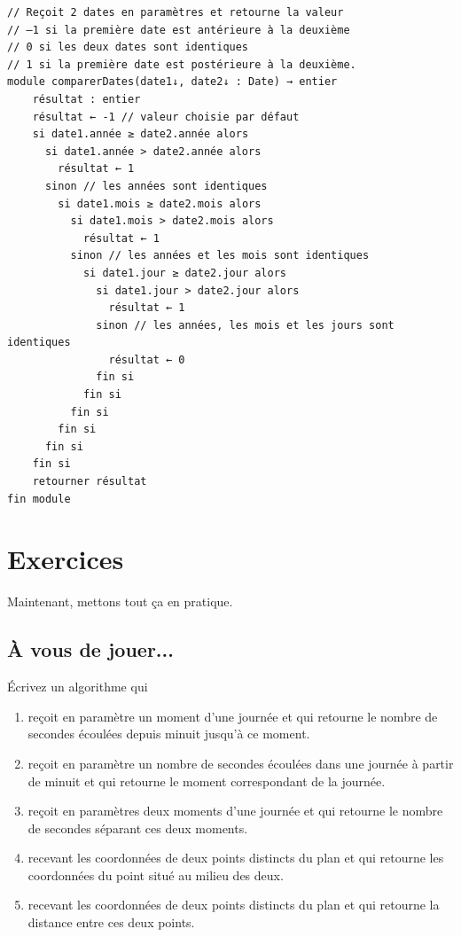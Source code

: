 \documentclass[11pt,a4paper]{article}
\begin{document}
            \par
        \begin{verbatim}
// Reçoit 2 dates en paramètres et retourne la valeur
// –1 si la première date est antérieure à la deuxième
// 0 si les deux dates sont identiques
// 1 si la première date est postérieure à la deuxième.
module comparerDates(date1↓, date2↓ : Date) → entier
    résultat : entier
    résultat ← -1 // valeur choisie par défaut
    si date1.année ≥ date2.année alors
      si date1.année > date2.année alors
        résultat ← 1
      sinon // les années sont identiques
        si date1.mois ≥ date2.mois alors
          si date1.mois > date2.mois alors
            résultat ← 1
          sinon // les années et les mois sont identiques
            si date1.jour ≥ date2.jour alors
              si date1.jour > date2.jour alors
                résultat ← 1
              sinon // les années, les mois et les jours sont identiques
                résultat ← 0
              fin si
            fin si
          fin si
        fin si
      fin si
    fin si
    retourner résultat
fin module
      \end{verbatim}\section{Exercices}
				Maintenant, mettons tout \c ca en pratique.
      
            \par
        \subsection{\`A vous de jouer...}
        \'Ecrivez un algorithme qui 
          
					\begin{enumerate}
				
			\item re\c coit en param\`etre un moment d'une journ\'ee et qui retourne le nombre de secondes \'ecoul\'ees depuis minuit jusqu'\`a ce moment.
			\item 
              re\c coit en param\`etre un nombre de secondes \'ecoul\'ees dans une journ\'ee 
              \`a partir de minuit et qui retourne le moment correspondant de la journ\'ee.
			\item re\c coit en param\`etres deux moments d'une journ\'ee et qui retourne le
              nombre de secondes s\'eparant ces deux moments.
			\item recevant les coordonn\'ees de deux points distincts du plan et qui retourne
              les coordonn\'ees du point situ\'e au milieu des deux.
			\item recevant les coordonn\'ees de deux points distincts du plan et qui retourne
              la distance entre ces deux points.
					\end{enumerate}
				
\end{document}
